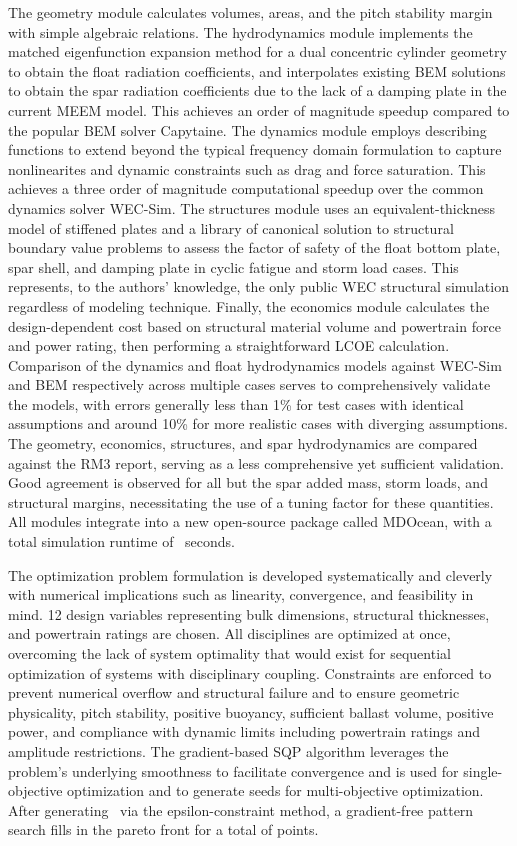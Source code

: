 \documentclass[preprint,12pt]{elsarticle}
\begin{document}
The geometry module calculates volumes, areas, and the pitch stability margin with simple algebraic relations.
The hydrodynamics module implements the matched eigenfunction expansion method for a dual concentric cylinder geometry to obtain the float radiation coefficients, and interpolates existing BEM solutions to obtain the spar radiation coefficients due to the lack of a damping plate in the current MEEM model.
This achieves an order of magnitude speedup compared to the popular BEM solver Capytaine.
The dynamics module employs describing functions to extend beyond the typical frequency domain formulation to capture nonlinearites and dynamic constraints such as drag and force saturation.
This achieves a three order of magnitude computational speedup over the common dynamics solver WEC-Sim.
The structures module uses an equivalent-thickness model of stiffened plates and a library of canonical solution to structural boundary value problems to assess the factor of safety of the float bottom plate, spar shell, and damping plate in cyclic fatigue and storm load cases.
This represents, to the authors' knowledge, the only public WEC structural simulation regardless of modeling technique.
Finally, the economics module calculates the design-dependent cost based on structural material volume and powertrain force and power rating, then performing a straightforward LCOE calculation.
Comparison of the dynamics and float hydrodynamics models against WEC-Sim and BEM respectively across multiple cases serves to comprehensively validate the models, with errors generally less than 1\% for test cases with identical assumptions and around 10\% for more realistic cases with diverging assumptions.
The geometry, economics, structures, and spar hydrodynamics are compared against the RM3 report, serving as a less comprehensive yet sufficient validation.
Good agreement is observed for all but the spar added mass, storm loads, and structural margins, necessitating the use of a tuning factor for these quantities.
All modules integrate into a new open-source package called MDOcean, with a total simulation runtime of \simRuntime~seconds.

The optimization problem formulation is developed systematically and cleverly with numerical implications such as linearity, convergence, and feasibility in mind.
12 design variables representing bulk dimensions, structural thicknesses, and powertrain ratings are chosen.
All disciplines are optimized at once, overcoming the lack of system optimality that would exist for sequential optimization of systems with disciplinary coupling.
Constraints are enforced to prevent numerical overflow and structural failure and to ensure geometric physicality, pitch stability, positive buoyancy, sufficient ballast volume, positive power, and compliance with dynamic limits including powertrain ratings and amplitude restrictions. 
The gradient-based SQP algorithm leverages the problem's underlying smoothness to facilitate convergence and is used for single-objective optimization and to generate seeds for multi-objective optimization.
After generating \numParetoSeeds~via the epsilon-constraint method, a gradient-free pattern search fills in the pareto front for a total of \numParetoSearchPoints points.
\end{document}
